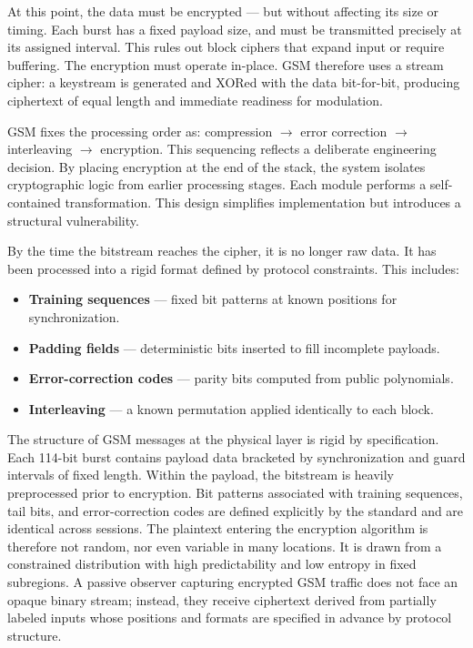 At this point, the data must be encrypted — but without affecting its size or timing. Each burst has a fixed payload size, and must be transmitted precisely at its assigned interval. This rules out block ciphers that expand input or require buffering. The encryption must operate in-place. GSM therefore uses a stream cipher: a keystream is generated and XORed with the data bit-for-bit, producing ciphertext of equal length and immediate readiness for modulation.

GSM fixes the processing order as: compression $\rightarrow$ error correction $\rightarrow$ interleaving $\rightarrow$ encryption. This sequencing reflects a deliberate engineering decision. By placing encryption at the end of the stack, the system isolates cryptographic logic from earlier processing stages. Each module performs a self-contained transformation. This design simplifies implementation but introduces a structural vulnerability.

By the time the bitstream reaches the cipher, it is no longer raw data. It has been processed into a rigid format defined by protocol constraints. This includes:

\begin{itemize}
  \item \textbf{Training sequences} — fixed bit patterns at known positions for synchronization.
  \item \textbf{Padding fields} — deterministic bits inserted to fill incomplete payloads.
  \item \textbf{Error-correction codes} — parity bits computed from public polynomials.
  \item \textbf{Interleaving} — a known permutation applied identically to each block.
\end{itemize}

The structure of GSM messages at the physical layer is rigid by specification. Each 114-bit burst contains payload data bracketed by synchronization and guard intervals of fixed length. Within the payload, the bitstream is heavily preprocessed prior to encryption. Bit patterns associated with training sequences, tail bits, and error-correction codes are defined explicitly by the standard and are identical across sessions. The plaintext entering the encryption algorithm is therefore not random, nor even variable in many locations. It is drawn from a constrained distribution with high predictability and low entropy in fixed subregions. A passive observer capturing encrypted GSM traffic does not face an opaque binary stream; instead, they receive ciphertext derived from partially labeled inputs whose positions and formats are specified in advance by protocol structure.

